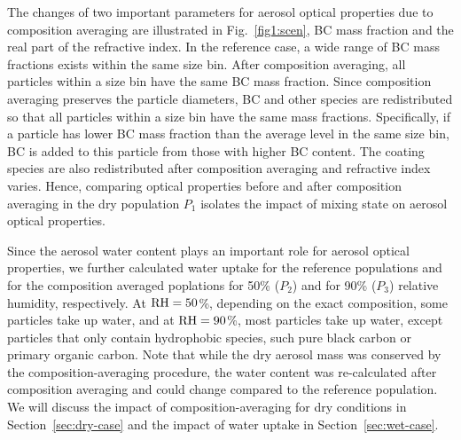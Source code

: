 \documentclass[edeposit,fullpage]{uiucthesis2009}
\begin{document}
The changes of two important parameters for aerosol optical properties
due to composition averaging are illustrated in Fig.~\ref{fig1:scen},
BC mass fraction and the real part of the refractive index. In the
reference case, a wide range of BC mass fractions exists within the
same size bin. After composition averaging, all particles within a
size bin have the same BC mass fraction.  Since composition averaging
preserves the particle diameters, BC and other species are
redistributed so that all particles within a size bin have the same
mass fractions. Specifically, if a particle has lower BC mass fraction
than the average level in the same size bin, BC is added to this
particle from those with higher BC content. The coating species are
also redistributed after composition averaging and refractive index
varies. Hence, comparing optical properties before and after
composition averaging in the dry population $P_1$ isolates the impact
of mixing state on aerosol optical properties.


Since the aerosol water content plays an important role for aerosol
optical properties, we further calculated water uptake for the
reference populations and for the composition averaged poplations for
50\% ($P_2$) and for 90\% ($P_3$) relative humidity, respectively.  At
$\rm RH = 50$\%, depending on the exact composition, some particles
take up water, and at $\rm RH = 90$\%, most particles take up water,
except particles that only contain hydrophobic species, such pure
black carbon or primary organic carbon. Note that while the dry
aerosol mass was conserved by the composition-averaging procedure, the
water content was re-calculated after composition averaging and could
change compared to the reference population. We will discuss the
impact of composition-averaging for dry conditions in
Section~\ref{sec:dry-case} and the impact of water uptake in
Section~\ref{sec:wet-case}.
\end{document}
